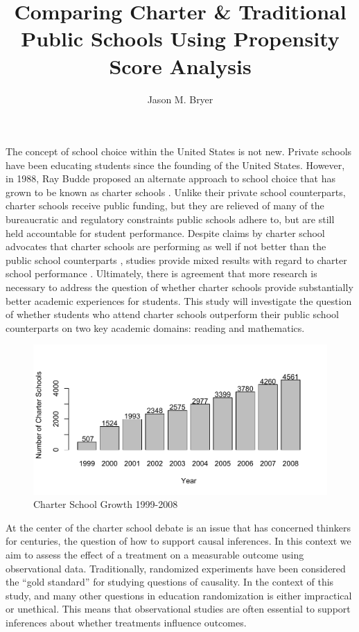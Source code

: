 \documentclass[man,floatsintext]{apa6}
\title{Comparing Charter \& Traditional Public Schools Using Propensity Score Analysis}
\author{Jason M. Bryer}
\affiliation{University at Albany, SUNY}
\begin{document}
\maketitle

The concept of school choice within the United States is not new. Private schools have been educating students since the founding of the United States. However, in 1988, Ray Budde proposed an alternate approach to school choice that has grown to be known as charter schools \parencite{Kolderie2005}. Unlike their private school counterparts, charter schools receive public funding, but they are relieved of many of the bureaucratic and regulatory constraints public schools adhere to, but are still held accountable for student performance. Despite claims by charter school advocates that charter schools are performing as well if not better than the public school counterparts \parencite[see e.g.][]{AllenConsolettieKerwin2009}, studies provide mixed results with regard to charter school performance \parencite[see e.g.][]{BraunJenkinsGrigg2006,credo,HubbardKulkarni2009}. Ultimately, there is agreement that more research is necessary to address the question of whether charter schools provide substantially better academic experiences for students. This study will investigate the question of whether students who attend charter schools outperform their public school counterparts on two key academic domains: reading and mathematics.

\begin{figure}[tp]
\includegraphics[width=\textwidth]{../Figures/CharterSchoolGrowth.pdf}
\caption{Charter School Growth 1999-2008}
\label{fig:charterSchoolGrowth}
\end{figure}

At the center of the charter school debate is an issue that has concerned thinkers for centuries, the question of how to support causal inferences. In this context we aim to assess the effect of a treatment on a measurable outcome using observational data. Traditionally, randomized experiments have been considered the ``gold standard'' for studying questions of causality. In the context of this study, and many other questions in education randomization is either impractical or unethical. This means that observational studies are often essential to support inferences about whether treatments influence outcomes.
\end{document}
